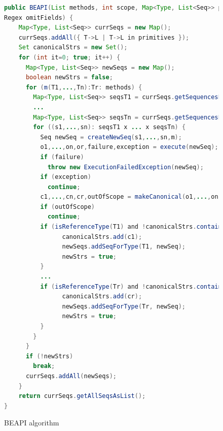 \begin{figure}[t!]

\begin{lstlisting}[language=Java]
public BEAPI(List methods, int scope, Map<Type, List<Seq>> primitives, 
Regex omitFields) {
    Map<Type, List<Seq>> currSeqs = new Map();
    currSeqs.addAll({ T->L | T->L in primitives });
    Set canonicalStrs = new Set();
    for (int it=0; true; it++) {
      Map<Type, List<Seq>> newSeqs = new Map();
      boolean newStrs = false;
      for (m(T1,...,Tn):Tr: methods) {
        Map<Type, List<Seq>> seqsT1 = currSeqs.getSequencesForType(T1);
        ...
        Map<Type, List<Seq>> seqsTn = currSeqs.getSequencesForType(Tn);
        for ((s1,...,sn): seqsT1 x ... x seqsTn) {
          Seq newSeq = createNewSeq(s1,...,sn,m);
          o1,...,on,or,failure,exception = execute(newSeq);
          if (failure) 
            throw new ExecutionFailedException(newSeq);
          if (exception) 
            continue;
          c1,...,cn,cr,outOfScope = makeCanonical(o1,...,on,scope,omitFields);
          if (outOfScope) 
            continue;
          if (isReferenceType(T1) and !canonicalStrs.contains(c1)) {
                canonicalStrs.add(c1);
                newSeqs.addSeqForType(T1, newSeq);
                newStrs = true;
          }
          ...
          if (isReferenceType(Tr) and !canonicalStrs.contains(cr)) {
                canonicalStrs.add(cr);
                newSeqs.addSeqForType(Tr, newSeq);
                newStrs = true;
          }
        }
      }
      if (!newStrs) 
        break;
      currSeqs.addAll(newSeqs);
    }
    return currSeqs.getAllSeqsAsList();
}
\end{lstlisting}
\caption{\textsf{BEAPI} algorithm}
\label{alg:beapi}
\end{figure}


